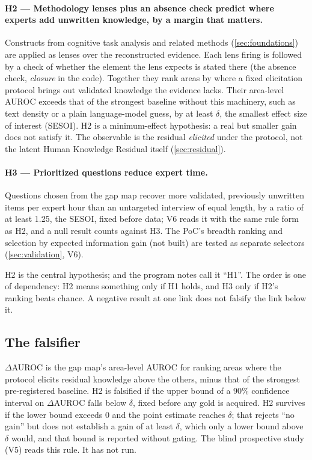 \paragraph{H2 --- Methodology lenses plus an absence check predict where experts add unwritten
knowledge, by a margin that matters.} Constructs from cognitive task analysis and related methods
(\cref{sec:foundations}) are applied as lenses over the reconstructed evidence. Each lens firing is
followed by a check of whether the element the lens expects is stated there (the absence check,
\emph{closure} in the code). Together they rank areas by where a fixed elicitation protocol brings out
validated knowledge the evidence lacks. Their area-level AUROC exceeds that of the strongest baseline
without this machinery, such as text density or a plain language-model guess, by at least $\delta$, the
smallest effect size of interest (SESOI). H2 is a minimum-effect hypothesis: a real but smaller gain
does not satisfy it. The observable is the residual \emph{elicited} under the protocol, not the latent
Human Knowledge Residual itself (\cref{sec:residual}).

\paragraph{H3 --- Prioritized questions reduce expert time.} Questions chosen from the gap map
recover more validated, previously unwritten items per expert hour than an untargeted interview of
equal length, by a ratio of at least 1.25, the SESOI, fixed before data; V6 reads it with the same rule
form as H2, and a null result counts against H3. The PoC's breadth ranking and selection by expected information gain (not built)
are tested as separate selectors (\cref{sec:validation}, V6).

\evint{} H2 is the central hypothesis;  and the program notes call it
\enquote{H1}. The order is one of dependency: H2 means something only if H1 holds, and H3 only if
H2's ranking beats chance. A negative result at one link does not falsify the link below it.

\subsection{The falsifier}

\begin{evfutbox}
  $\Delta$AUROC is the gap map's area-level AUROC for ranking areas where the protocol elicits
  residual knowledge above the others, minus that of the strongest pre-registered baseline. H2 is
  falsified if the upper bound of a 90\% confidence interval on $\Delta$AUROC falls below $\delta$,
  fixed before any gold is acquired. H2 survives if the lower bound exceeds 0 and the point estimate
  reaches $\delta$; that rejects \enquote{no gain} but does not establish a gain of at least $\delta$,
  which only a lower bound above $\delta$ would, and that bound is reported without gating. The blind
  prospective study (V5) reads this rule. It has not run.
\end{evfutbox}

